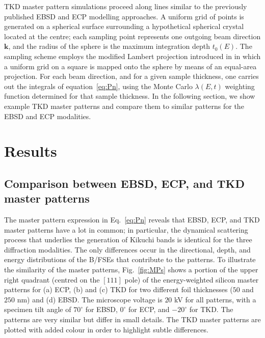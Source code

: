TKD master pattern simulations proceed along lines similar to the previously published EBSD \cite{degraef2013e} and ECP \cite{degraef2017k} modelling approaches. A uniform grid of points is generated on a spherical surface surrounding a hypothetical spherical crystal located at the centre; each sampling point represents one outgoing beam direction $\mathbf{k}$, and the radius of the sphere is the maximum integration depth $t_0(E)$.  The sampling scheme employs the modified Lambert projection introduced in
\cite{rosca2010a, degraef2013e} in which a uniform grid on a square is mapped onto the sphere by means of an
equal-area projection. For each beam direction, and for a given sample thickness, one carries out the
integrals of equation~\ref{eq:Pn}, using the Monte Carlo $\lambda(E,t)$ weighting function determined for that sample thickness.  In the following section, we show example TKD master patterns and compare them to similar patterns for the EBSD and ECP modalities.



\section{Results\label{sec:results}}

\subsection{Comparison between EBSD, ECP, and TKD master patterns}
\label{sec:comparison}
The master pattern expression in Eq.~\ref{eq:Pn} reveals that EBSD, ECP, and TKD master patterns have a lot in common; in particular, the dynamical scattering process that underlies the generation of Kikuchi bands is identical for the three diffraction modalities. The only differences occur in the directional, depth, and energy distributions of the B/FSEs that contribute to the patterns.  To illustrate the similarity of the master patterns, Fig.~\ref{fig:MPs} shows a portion of the upper right quadrant (centred on the $[111]$ pole) of the energy-weighted silicon master patterns for (a) ECP, (b) and (c) TKD for two different foil thicknesses ($50$ and $250$ nm) and (d) EBSD. The  microscope voltage is $20$ kV for all patterns, with a specimen tilt angle of $70^{\circ}$ for EBSD, $0^{\circ}$ for ECP, and $-20^{\circ}$ for TKD.  The patterns are very similar but differ in small details. The TKD master patterns are plotted with added colour in order to highlight  subtle differences.

